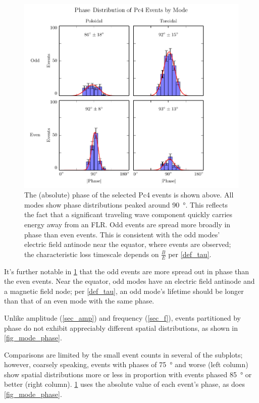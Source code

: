 \begin{figure}[!htb]
  \centering
  \includegraphics[width=\textwidth]{figures/phase.pdf}
  \caption[Phase Distribution of Pc4 Events by Mode]{
    The (absolute) phase of the selected Pc4 events is shown above. All modes
    show phase distributions peaked around \SI{90}{\degree}. This reflects the
    fact that a significant traveling wave component quickly carries energy
    away from an FLR. Odd events are spread more broadly in phase than even
    events. This is consistent with the odd modes' electric field antinode near
    the equator, where events are observed; the characteristic loss timescale
    depends on $\frac{B}{E}$ per \cref{def_tau}. 
  }
  \label{fig_phase}
\end{figure}

It's further notable in \cref{fig_phase} that the odd events are more spread
out in phase than the even events. Near the equator, odd modes have an electric
field antinode and a magnetic field node; per \cref{def_tau}, an odd mode's
lifetime should be longer than that of an even mode with the same phase. 

Unlike amplitude (\cref{sec_amp}) and frequency (\cref{sec_f}), events
partitioned by phase do not exhibit appreciably different spatial
distributions, as
shown in \cref{fig_mode_phase}. 




Comparisons are limited by the small event
counts in several of the subplots; however, coarsely speaking, events with
phases of \SI{75}{\degree} and worse (left column) show spatial distributions
more or less in proportion with events phased \SI{85}{\degree} or better (right
column). \cref{fig_phase} uses the absolute value of each event's phase, as
does \cref{fig_mode_phase}. 

